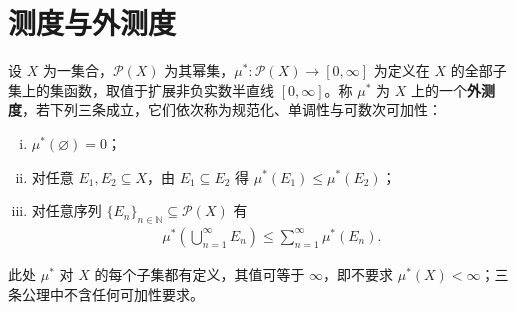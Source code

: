 \documentclass[../../main.tex]{subfiles}%
\begin{document}
\section{测度与外测度}\label{section:ch01-测度与外测度}

\begin{definition}[外测度]\label{definition:ch01-外测度}
设 $X$ 为一集合，$\mathcal{P}(X)$ 为其幂集，$\mu^*:\mathcal{P}(X)\to[0,\infty]$ 为定义在 $X$ 的全部子集上的集函数，取值于扩展非负实数半直线 $[0,\infty]$。称 $\mu^*$ 为 $X$ 上的一个\textbf{外测度}，若下列三条成立，它们依次称为规范化、单调性与可数次可加性：
\begin{enumerate}[(i)]
\item $\mu^*(\varnothing )=0$；
\item 对任意 $E_1,E_2\subseteq X$，由 $E_1\subseteq E_2$ 得 $\mu^*(E_1)\leqslant\mu^*(E_2)$；
\item 对任意序列 $\{E_n\}_{n\in\mathbb{N}}\subseteq\mathcal{P}(X)$ 有
\begin{align}
\mu^*\left(\bigcup_{n=1}^\infty E_n\right)\leqslant\sum_{n=1}^\infty\mu^*(E_n).\label{align:ch01-外测度次可加}
\end{align}
\end{enumerate}
此处 $\mu^*$ 对 $X$ 的每个子集都有定义，其值可等于 $\infty$，即不要求 $\mu^*(X)<\infty$；三条公理中不含任何可加性要求。
\end{definition}
\end{document}

